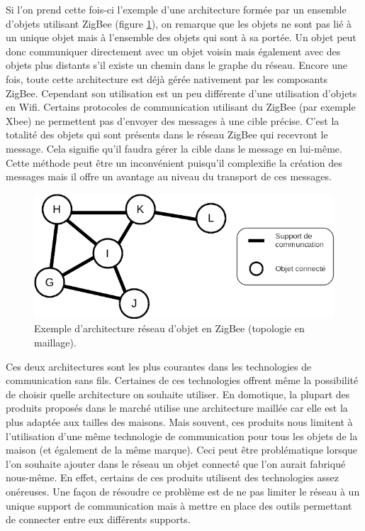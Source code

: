       Si l'on prend cette fois-ci l'exemple d'une architecture formée par un ensemble d'objets utilisant 
      ZigBee (figure \ref{netGraph}), on remarque que les objets ne sont pas lié à un unique objet
      mais à l'ensemble des objets qui sont à sa portée. Un objet peut donc communiquer directement
      avec un objet voisin mais également avec des objets plus distants s'il existe un chemin dans
      le graphe du réseau. Encore une fois, toute cette architecture est déjà gérée nativement par
      les composants ZigBee. Cependant son utilisation est un peu différente d'une utilisation 
		d'objets en Wifi. Certains protocoles de communication utilisant du ZigBee (par exemple Xbee) 
		ne permettent pas d'envoyer des messages à une cible précise. C'est la totalité des objets qui sont présents dans le réseau ZigBee qui recevront le message. Cela signifie qu'il faudra gérer
		la cible dans le message en lui-même. Cette méthode peut être un inconvénient puisqu'il complexifie la création des messages mais il offre un avantage au niveau du transport de ces
		messages.
      
      \begin{figure}[!ht]
         \centering
         \includegraphics[width=.8\textwidth]{img/reseau_graphe.png}
         \caption{Exemple d'architecture réseau d'objet en ZigBee (topologie en maillage).}
         \label{netGraph}
      \end{figure}
      
      Ces deux architectures sont les plus courantes dans les technologies de communication sans 
      fils. Certaines de ces technologies offrent même la possibilité de choisir quelle architecture 
		on souhaite utiliser. En domotique, la plupart des produits proposés dans le		marché 
		utilise une 		architecture maillée car elle est la plus adaptée aux tailles des maisons. 
		Mais 	souvent, ces 		produits nous limitent à l'utilisation d'une même technologie de 
		communication 	pour tous les objets 		de la maison (et également de la même marque). Ceci 
		peut être 	problématique lorsque l'on souhaite 		ajouter dans le réseau un objet 
		connecté que l'on aurait 	fabriqué nous-même. En effet, certains de 		ces produits 
		utilisent des technologies assez 	onéreuses. Une façon de résoudre ce problème est de ne 	
		pas limiter le réseau à un unique 	support de communication mais à mettre en place des 
		outils permettant de connecter entre eux 	différents supports.
		
